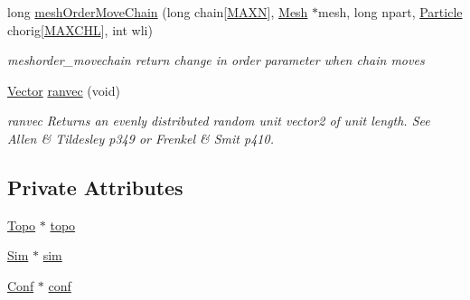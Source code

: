 \begin{DoxyCompactItemize}
long \hyperlink{class_move_creator_a46ef1e99782d3f335369fc178dc45d0f}{mesh\+Order\+Move\+Chain} (long chain\mbox{[}\hyperlink{macros_8h_ad1f79d9d99776d7353c6659c307c83c6}{M\+A\+X\+N}\mbox{]}, \hyperlink{class_mesh}{Mesh} $\ast$mesh, long npart, \hyperlink{class_particle}{Particle} chorig\mbox{[}\hyperlink{macros_8h_a6ba68031db49c489a6a5902f87b915c8}{M\+A\+X\+C\+H\+L}\mbox{]}, int wli)
\begin{DoxyCompactList}\small\item\em meshorder\+\_\+movechain return change in order parameter when chain moves \end{DoxyCompactList}\item 
\hyperlink{class_vector}{Vector} \hyperlink{class_move_creator_a6dad79041e592e9de8c30c82a4da6b1f}{ranvec} (void)
\begin{DoxyCompactList}\small\item\em ranvec Returns an evenly distributed random unit vector2 of unit length. See Allen \& Tildesley p349 or Frenkel \& Smit p410. \end{DoxyCompactList}\end{DoxyCompactItemize}
\subsection*{Private Attributes}
\begin{DoxyCompactItemize}
\item 
\hyperlink{class_topo}{Topo} $\ast$ \hyperlink{class_move_creator_a34a03c3300543b9db3f7b03bb77027d3}{topo}
\item 
\hyperlink{class_sim}{Sim} $\ast$ \hyperlink{class_move_creator_a75cae5ea1a390a8f3dc20e8870576404}{sim}
\item 
\hyperlink{class_conf}{Conf} $\ast$ \hyperlink{class_move_creator_ab8854d02b8ca0b270709909e2ed1fb27}{conf}
\end{DoxyCompactItemize}


